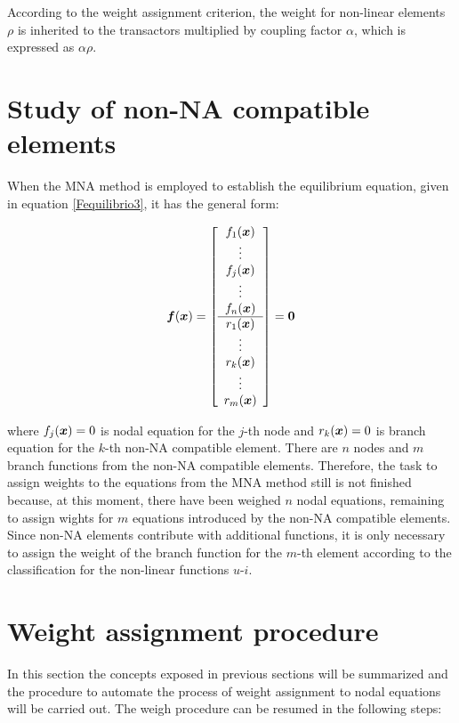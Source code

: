 \documentclass[conference,letterpaper,onecolumn,11pt]{IEEEtran}
\newcommand{\pig}[1]{\mbox{\boldmath ${#1}$}	}
\begin{document}
According to the weight assignment criterion, the weight for non-linear elements $\rho$ is inherited to the transactors multiplied by coupling factor $\alpha$, which is expressed as $\alpha\rho$.

\section{Study of non-NA compatible elements}

When the MNA method is employed to establish the equilibrium equation, given in equation \ref{Fequilibrio3}, it has the general form:

\begin{displaymath}
\pig{f}(\pig{x})=
\left[\begin{array}{c}
f_1(\pig{x}) \\ \vdots\\ f_j(\pig{x}) \\ \vdots\\ f_n (\pig{x})
\\\hline
r_1(\pig{x}) \\ \vdots\\ r_k(\pig{x}) \\ \vdots\\ r_m (\pig{x})
\end{array} \right]
= \pig{0}
\end{displaymath}

where $f_j(\pig{x})=0$ is nodal equation for the $j$-th node and $r_k(\pig{x})=0$ is branch equation for the $k$-th non-NA compatible element. There are $n$ nodes and $m$ branch functions from the non-NA compatible elements. Therefore, the task to assign weights to the equations from the MNA method still is not finished because, at this moment, there have been weighed $n$ nodal equations, remaining to assign wights for $m$ equations introduced by the non-NA compatible elements. Since non-NA elements contribute with additional functions, it is only necessary to assign the weight of the branch function for the $m$-th element according to the classification for the non-linear functions $u$-$i$.

\section{Weight assignment procedure}

In this section the concepts exposed in previous sections will be summarized and the procedure to automate the process of weight assignment to nodal equations will be carried out. The weigh procedure can be resumed in the following steps:
\end{document}
